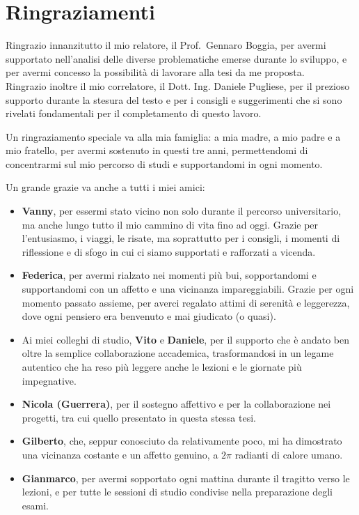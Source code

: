 \chapter*{Ringraziamenti}

Ringrazio innanzitutto il mio relatore, il Prof.\ Gennaro Boggia, per avermi supportato nell’analisi delle diverse problematiche emerse durante lo sviluppo, e per avermi concesso la possibilità di lavorare alla tesi da me proposta. \\
Ringrazio inoltre il mio correlatore, il Dott. Ing. Daniele Pugliese, per il prezioso supporto durante la stesura del testo e per i consigli e suggerimenti che si sono rivelati fondamentali per il completamento di questo lavoro.

\vspace{1em}
Un ringraziamento speciale va alla mia famiglia: a mia madre, a mio padre e a mio fratello, per avermi sostenuto in questi tre anni, permettendomi di concentrarmi sul mio percorso di studi e supportandomi in ogni momento.

\vspace{1em}
Un grande grazie va anche a tutti i miei amici:
\begin{itemize}
    \item \textbf{Vanny}, per essermi stato vicino non solo durante il percorso universitario, ma anche lungo tutto il mio cammino di vita fino ad oggi. Grazie per l’entusiasmo, i viaggi, le risate, ma soprattutto per i consigli, i momenti di riflessione e di sfogo in cui ci siamo supportati e rafforzati a vicenda.
    \item \textbf{Federica}, per avermi rialzato nei momenti più bui, sopportandomi e supportandomi con un affetto e una vicinanza impareggiabili. Grazie per ogni momento passato assieme, per averci regalato attimi di serenità e leggerezza, dove ogni pensiero era benvenuto e mai giudicato (o quasi).
    \item Ai miei colleghi di studio, \textbf{Vito} e \textbf{Daniele}, per il supporto che è andato ben oltre la semplice collaborazione accademica, trasformandosi in un legame autentico che ha reso più leggere anche le lezioni e le giornate più impegnative.
    \item \textbf{Nicola (Guerrera)}, per il sostegno affettivo e per la collaborazione nei progetti, tra cui quello presentato in questa stessa tesi.
    \item \textbf{Gilberto}, che, seppur conosciuto da relativamente poco, mi ha dimostrato una vicinanza costante e un affetto genuino, a $2\pi$ radianti di calore umano.
    \item \textbf{Gianmarco}, per avermi sopportato ogni mattina durante il tragitto verso le lezioni, e per tutte le sessioni di studio condivise nella preparazione degli esami.
\end{itemize}

